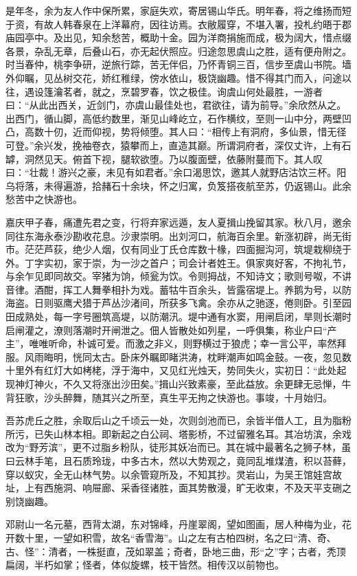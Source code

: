 \documentclass[]{article}
\begin{document}
是年冬，余为友人作中保所累，家庭失欢，寄居锡山华氏。明年春，将之维扬而短于资，有故人韩春泉在上洋幕府，因往访焉。衣敝履穿，不堪入署，投札约晤于郡庙园亭中。及出见，知余愁苦，概助十金。园为洋商捐施而成，极为阔大，惜点缀各景，杂乱无章，后叠山石，亦无起伏照应。归途忽思虞山之胜，适有便舟附之。时当春仲，桃李争研，逆旅行踪，苦无伴侣，乃怀青铜三百，信步至虞山书院。墙外仰瞩，见丛树交花，娇红稚绿，傍水依山，极饶幽趣。惜不得其门而入，问途以往，遇设篷瀹茗者，就之，烹碧罗春，饮之极佳。询虞山何处最胜，一游者曰：``从此出西关，近剑门，亦虞山最佳处也，君欲往，请为前导。''余欣然从之。出西门，循山脚，高低约数里，渐见山峰屹立，石作横纹，至则一山中分，两壁凹凸，高数十仞，近而仰视，势将倾堕。其人曰：``相传上有洞府，多仙景，惜无径可登。''余兴发，挽袖卷衣，猿攀而上，直造其巅。所谓洞府者，深仅丈许，上有石罅，洞然见天。俯首下视，腿软欲堕。乃以腹面壁，依藤附蔓而下。其人叹曰：``壮裁！游兴之豪，未见有如君者。''余口渴思饮，邀其人就野店沽饮三杯。阳乌将落，未得遍游，拾赭石十余块，怀之归寓，负笈搭夜航至苏，仍返锡山。此余愁苦中之快游也。

嘉庆甲子春，痛遭先君之变，行将弃家远遁，友人夏揖山挽留其家。秋八月，邀余同往东海永泰沙勘收花息。沙隶崇明。出刘河口，航海百余里。新涨初辟，尚无街市。茫茫芦荻，绝少人烟，仅有同业丁氏仓库数十椽，四面掘沟河，筑堤栽柳绕于外。丁字实初，家于崇，为一沙之首户；司会计者姓王。俱家爽好客，不拘礼节，与余乍见即同故交。宰猪为饷，倾瓮为饮。令则拇战，不知诗文；歌则号呶，不讲音律。酒酣，挥工人舞拳相扑为戏。蓄牯牛百余头，皆露宿堤上。养鹅为号，以防海盗。日则驱鹰犬猎于芦丛沙渚间，所获多飞禽。余亦从之驰逐，倦则卧。引至园田成熟处，每一字号圈筑高堤，以防潮汛。堤中通有水窦，用闸启闭，旱则长潮时启闸灌之，潦则落潮时开闸泄之。佃人皆散处如列星，一呼俱集，称业户曰``产主''，唯唯听命，朴诚可爱。而激之非义，则野横过于狼虎；幸一言公平，率然拜服。风雨晦明，恍同太古。卧床外瞩即睹洪涛，枕畔潮声如鸣金鼓。一夜，忽见数十里外有红灯大如栲栳，浮于海中，又见红光烛天，势同失火，实初日：``此处起现神灯神火，不久又将涨出沙田矣。''揖山兴致素豪，至此益放。余更肆无忌惮，牛背狂歌，沙头醉舞，随其兴之所至，真生平无拘之快游也。事竣，十月始归。

吾苏虎丘之胜，余取后山之千顷云一处，次则剑池而已，余皆半借人工，且为脂粉所污，已失山林本相。即新起之白公祠、塔影桥，不过留雅名耳。其冶坊滨，余戏改为``野芳滨''，更不过脂乡粉队，徒形其妖冶而已。其在城中最著名之狮子林，虽曰云林手笔，且石质玲珑，中多古木，然以大势观之，竟同乱堆煤渣，积以苔藓，穿以蚁灾，全无山林气势。以余管窥所及，不知其抄。灵岩山，为吴王馆娃宫故址，上有西施洞、响屉廊、采香径诸胜，面其势散漫，旷无收束，不及天平支硎之别饶幽趣。

邓尉山一名元墓，西背太湖，东对锦峰，丹崖翠阁，望如图画，居人种梅为业，花开数十里，一望如积雪，故名``香雪海''。山之左有古柏四树，名之曰``清、奇、古、怪''：清者，一株挺直，茂如翠盖；奇者，卧地三曲，形``之''字；古者，秃顶扁阔，半朽如掌；怪者，体似旋螺，枝干皆然。相传汉以前物也。
\end{document}
